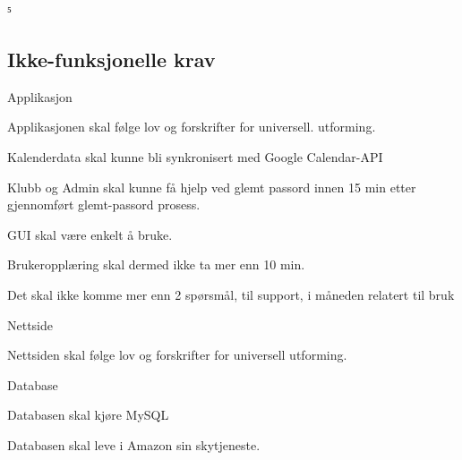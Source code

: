 ⁵\documentclass[norsk]{article}
\begin{document}
\begin{legal}
    \subsection{Ikke-funksjonelle krav}
    \item Applikasjon
    \begin{legal}
        \item Applikasjonen skal følge lov og forskrifter for universell. utforming.
        \item Kalenderdata skal kunne bli synkronisert med Google Calendar-API
        \item Klubb og Admin skal kunne få hjelp ved glemt passord innen 15 min etter gjennomført glemt-passord prosess. 
        \item GUI skal være enkelt å bruke. %
        \begin{legal}
            \item Brukeropplæring skal dermed ikke ta mer enn 10 min. 
            \item Det skal ikke komme mer enn 2 spørsmål, til support, i måneden relatert til bruk
        \end{legal}
    \end{legal}
    \item Nettside 
    \begin{legal}
        \item Nettsiden skal følge lov og forskrifter for universell utforming.
    \end{legal}
    \item Database
    \begin{legal}
        \item Databasen skal kjøre MySQL
        \item Databasen skal leve i Amazon sin skytjeneste.
    \end{legal}


\end{legal}
\end{document}
